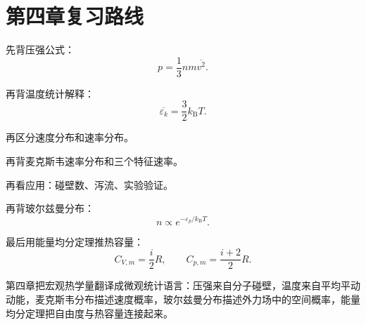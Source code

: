 \section{第四章复习路线}

\begin{MethodBox}[建议背诵顺序]
\begin{ReviewList}
  \item 先背压强公式：
  \[
    p=\frac13nm\overline{v^2}.
  \]
  \item 再背温度统计解释：
  \[
    \overline{\varepsilon_k}=\frac32k_{\mathrm B}T.
  \]
  \item 再区分速度分布和速率分布。
  \item 再背麦克斯韦速率分布和三个特征速率。
  \item 再看应用：碰壁数、泻流、实验验证。
  \item 再背玻尔兹曼分布：
  \[
    n\propto e^{-\varepsilon_p/k_{\mathrm B}T}.
  \]
  \item 最后用能量均分定理推热容量：
  \[
    C_{V,m}=\frac{i}{2}R,\qquad C_{p,m}=\frac{i+2}{2}R.
  \]
\end{ReviewList}
\end{MethodBox}

\begin{KeyBox}[第四章一句话总结]
第四章把宏观热学量翻译成微观统计语言：压强来自分子碰壁，温度来自平均平动动能，麦克斯韦分布描述速度概率，玻尔兹曼分布描述外力场中的空间概率，能量均分定理把自由度与热容量连接起来。
\end{KeyBox}